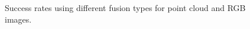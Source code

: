 \begin{figure}
{

    }
    \caption{Success rates using different fusion types for point cloud and RGB images.}
    \label{fig:ablation_fusion}
\end{figure}
